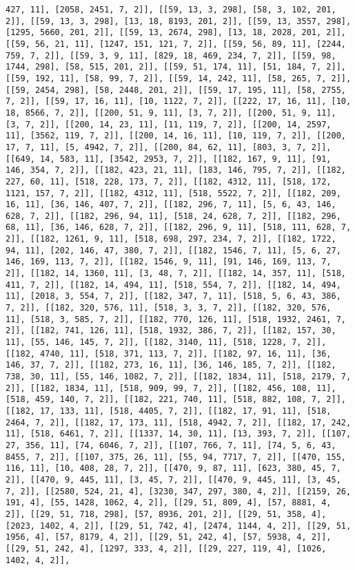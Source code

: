 \documentclass[12pt,fleqn]{article}\usepackage{../../common}
\begin{document}
\begin{verbatim}
427, 11], [2058, 2451, 7, 2]], [[59, 13, 3, 298], [58, 3, 102, 201, 2]], [[59, 13, 3, 298], [13, 18, 8193, 201, 2]], [[59, 13, 3557, 298], [1295, 5660, 201, 2]], [[59, 13, 2674, 298], [13, 18, 2028, 201, 2]], [[59, 56, 21, 11], [1247, 151, 121, 7, 2]], [[59, 56, 89, 11], [2244, 759, 7, 2]], [[59, 3, 9, 11], [829, 18, 469, 234, 7, 2]], [[59, 98, 1744, 298], [58, 515, 201, 2]], [[59, 51, 174, 11], [51, 184, 7, 2]], [[59, 192, 11], [58, 99, 7, 2]], [[59, 14, 242, 11], [58, 265, 7, 2]], [[59, 2454, 298], [58, 2448, 201, 2]], [[59, 17, 195, 11], [58, 2755, 7, 2]], [[59, 17, 16, 11], [10, 1122, 7, 2]], [[222, 17, 16, 11], [10, 18, 8566, 7, 2]], [[200, 51, 9, 11], [3, 7, 2]], [[200, 51, 9, 11], [3, 7, 2]], [[200, 14, 23, 11], [11, 119, 7, 2]], [[200, 14, 2597, 11], [3562, 119, 7, 2]], [[200, 14, 16, 11], [10, 119, 7, 2]], [[200, 17, 7, 11], [5, 4942, 7, 2]], [[200, 84, 62, 11], [803, 3, 7, 2]], [[649, 14, 583, 11], [3542, 2953, 7, 2]], [[182, 167, 9, 11], [91, 146, 354, 7, 2]], [[182, 423, 21, 11], [183, 146, 795, 7, 2]], [[182, 227, 60, 11], [518, 228, 173, 7, 2]], [[182, 4312, 11], [518, 172, 1121, 157, 7, 2]], [[182, 4312, 11], [518, 5522, 7, 2]], [[182, 209, 16, 11], [36, 146, 407, 7, 2]], [[182, 296, 7, 11], [5, 6, 43, 146, 628, 7, 2]], [[182, 296, 94, 11], [518, 24, 628, 7, 2]], [[182, 296, 68, 11], [36, 146, 628, 7, 2]], [[182, 296, 9, 11], [518, 111, 628, 7, 2]], [[182, 1261, 9, 11], [518, 698, 297, 234, 7, 2]], [[182, 1722, 94, 11], [202, 146, 47, 380, 7, 2]], [[182, 1546, 7, 11], [5, 6, 27, 146, 169, 113, 7, 2]], [[182, 1546, 9, 11], [91, 146, 169, 113, 7, 2]], [[182, 14, 1360, 11], [3, 48, 7, 2]], [[182, 14, 357, 11], [518, 411, 7, 2]], [[182, 14, 494, 11], [518, 554, 7, 2]], [[182, 14, 494, 11], [2018, 3, 554, 7, 2]], [[182, 347, 7, 11], [518, 5, 6, 43, 386, 7, 2]], [[182, 320, 576, 11], [518, 3, 3, 7, 2]], [[182, 320, 576, 11], [518, 3, 585, 7, 2]], [[182, 770, 126, 11], [518, 1932, 2461, 7, 2]], [[182, 741, 126, 11], [518, 1932, 386, 7, 2]], [[182, 157, 30, 11], [55, 146, 145, 7, 2]], [[182, 3140, 11], [518, 1228, 7, 2]], [[182, 4740, 11], [518, 371, 113, 7, 2]], [[182, 97, 16, 11], [36, 146, 37, 7, 2]], [[182, 273, 16, 11], [36, 146, 185, 7, 2]], [[182, 738, 30, 11], [55, 146, 1082, 7, 2]], [[182, 1834, 11], [518, 2179, 7, 2]], [[182, 1834, 11], [518, 909, 99, 7, 2]], [[182, 456, 108, 11], [518, 459, 140, 7, 2]], [[182, 221, 740, 11], [518, 882, 108, 7, 2]], [[182, 17, 133, 11], [518, 4405, 7, 2]], [[182, 17, 91, 11], [518, 2464, 7, 2]], [[182, 17, 173, 11], [518, 4942, 7, 2]], [[182, 17, 242, 11], [518, 6461, 7, 2]], [[1337, 14, 30, 11], [13, 393, 7, 2]], [[107, 27, 356, 11], [74, 6046, 7, 2]], [[107, 766, 7, 11], [74, 5, 6, 43, 8455, 7, 2]], [[107, 375, 26, 11], [55, 94, 7717, 7, 2]], [[470, 155, 116, 11], [10, 408, 28, 7, 2]], [[470, 9, 87, 11], [623, 380, 45, 7, 2]], [[470, 9, 445, 11], [3, 45, 7, 2]], [[470, 9, 445, 11], [3, 45, 7, 2]], [[2580, 524, 21, 4], [3230, 347, 297, 380, 4, 2]], [[2159, 26, 191, 4], [55, 1428, 1062, 4, 2]], [[29, 51, 809, 4], [57, 8881, 4, 2]], [[29, 51, 718, 298], [57, 8936, 201, 2]], [[29, 51, 358, 4], [2023, 1402, 4, 2]], [[29, 51, 742, 4], [2474, 1144, 4, 2]], [[29, 51, 1956, 4], [57, 8179, 4, 2]], [[29, 51, 242, 4], [57, 5938, 4, 2]], [[29, 51, 242, 4], [1297, 333, 4, 2]], [[29, 227, 119, 4], [1026, 1402, 4, 2]], 
\end{verbatim}
\end{document}
